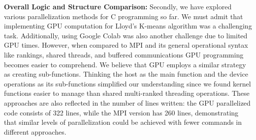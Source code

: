 \documentclass{article}
\begin{document}
\textbf{Overall Logic and Structure Comparison:} Secondly, we have explored various parallelization methods for C programming so far. We must admit that implementing GPU computation for Lloyd's K-means algorithm was a challenging task. Additionally, using Google Colab  was also another challenge due to limited GPU times. However, when compared to MPI and its general operational syntax like rankings, shared threads, and buffered communications GPU programming becomes easier to comprehend. We believe that GPU employs a similar strategy as creating sub-functions. Thinking the host as the main function and the device operations as its sub-functions simplified our understanding since we found kernel functions easier to manage than shared multi-ranked threading operations. These approaches are also reflected in the number of lines written: the GPU parallelized code consists of 322 lines, while the MPI version has 260 lines, demonstrating that similar levels of parallelization could be achieved with fewer commands in different approaches.
\end{document}
